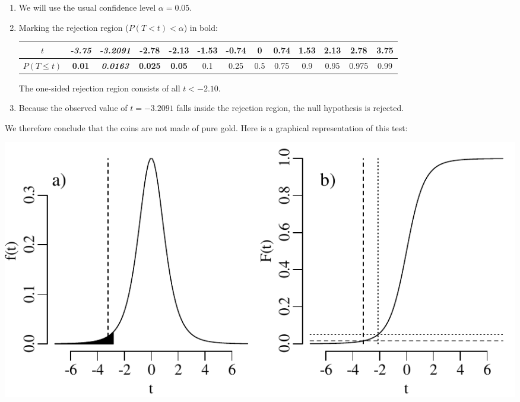 \begin{enumerate}
\item We will use the usual confidence level $\alpha = 0.05$.

\item Marking the rejection region ($P(T<t)<\alpha$) in bold:
  
  \begin{center}
    \begin{tabular}{c|c@{\gap}c@{\gap}c@{\gap}c@{\gap}
        c@{\gap}c@{\gap}c@{\gap}c@{\gap}c@{\gap}c@{\gap}c@{\gap}c}
      $t$ & \textbf{\textit{-3.75}} & \textbf{\emph{-3.2091}} & \textbf{-2.78} &
      \textbf{-2.13} & -1.53 & -0.74 & 0 & 0.74 & 1.53 & 2.13 & 2.78 & 3.75 \\ \hline
      $P(T\leq{t})$ & \textbf{0.01} & \textbf{\textit{0.0163}} & \textbf{0.025} &
      \textbf{0.05} & 0.1 & 0.25 & 0.5 & 0.75 & 0.9 &
      0.95 & 0.975 & 0.99
    \end{tabular}
  \end{center}

  The one-sided rejection region consists of all $t<-2.10$.

\item Because the observed value of $t=-3.2091$ falls inside the
  rejection region, the null hypothesis is rejected.

\end{enumerate}

We therefore conclude that the coins are not made of pure gold. Here
is a graphical representation of this test:

\noindent\begin{minipage}[t][][b]{.6\textwidth}
  \includegraphics[]{../figures/1samplettest.pdf}\medskip
\end{minipage}
\begin{minipage}[t][][t]{.4\textwidth}
  \label{fig:1samplettest}
\end{minipage}

